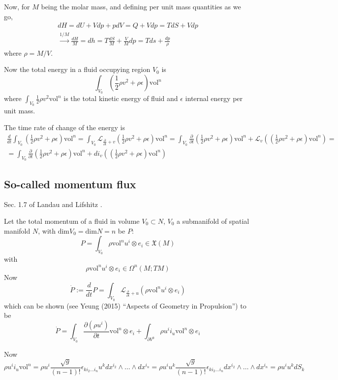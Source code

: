 \documentclass[twoside,landscape,10pt]{amsart}
\theoremstyle{plain}
\theoremstyle{definition}
\theoremstyle{remark}
\theoremstyle{remark}
\begin{document}
\begin{multicols*}{2}
Now, for $M$ being the molar mass, and defining per unit mass quantities as we go,
\[
\begin{gathered}
  dH = dU + Vdp + pdV = Q + Vdp = TdS + Vdp \\
  \xrightarrow{ 1/M} \frac{dH}{M} = dh = T \frac{dS}{M} + \frac{V}{M} dp = Tds + \frac{dp}{\rho}
\end{gathered}
\]
where $\rho = M/V$.  

Now the total energy in a fluid occupying region $V_0$ is 
\[
\int_{V_0} \left( \frac{1}{2} \rho v^2 + \rho \epsilon \right)\text{vol}^n
\]
where $\int_{V_0} \frac{1}{2} \rho v^2 \text{vol}^n$ is the total kinetic energy of fluid and $\epsilon$ internal energy per unit mass.  

The time rate of change of the energy is 
\[
\begin{gathered}
  \frac{d}{dt} \int_{V_0} ( \frac{1}{2} \rho v^2 + \rho \epsilon )\text{vol}^n = \int_{V_0} \mathcal{L}_{ \frac{\partial}{\partial t} + v } (\frac{1}{2} \rho v^2 + \rho \epsilon )\text{vol}^n = \int_{V_0} \frac{\partial }{\partial t} (\frac{1}{2} \rho v^2 + \rho \epsilon ) \text{vol}^n + \mathcal{L}_v ((\frac{1}{2} \rho v^2 + \rho \epsilon ) \text{vol}^n ) = \\
  = \int_{V_0} \frac{\partial }{\partial t} (\frac{1}{2} \rho v^2 + \rho \epsilon ) \text{vol}^n + di_v ((\frac{1}{2} \rho v^2 + \rho \epsilon ) \text{vol}^n ) 
\end{gathered}
\]

\subsection*{So-called momentum flux}

Sec. 1.7 of Landau and Lifshitz \cite{LLandauELifshitz1987}.  

Let the total momentum of a fluid in volume $V_0 \subset N$, $V_0$ a submanifold of spatial manifold $N$, with $\text{dim}V_0 = \text{dim}N =n$ be $P$:
\[
P = \int_{V_0} \rho \text{vol}^n u^i \otimes e_i \in \mathfrak{X}(M)
\]
with 
\[
\rho \text{vol}^n u^i \otimes e_i \in \Omega^n(M;TM)
\]
Now 
\[
\dot{P} := \frac{d}{dt}P = \int_{V_0} \mathcal{L}_{\frac{ \partial}{\partial t} + u} (\rho \text{vol}^nu^i \otimes e_i)
\]
which can be shown (see Yeung (2015) ``Aspects of Geometry in Propulsion'') to be
\[
\dot{P} = \int_{V_0} \frac{ \partial (\rho u^i)}{ \partial t} \text{vol}^n \otimes e_i + \int_{\partial V^0} \rho u^i i_u \text{vol}^n \otimes e_i
\]

Now
\[
\rho u^i i_u \text{vol}^n = \rho u^i \frac{\sqrt{g}}{(n-1)!} \epsilon_{ki_2\dots i_n} u^k dx^{i_2} \wedge \dots \wedge dx^{i_n} = \rho u^i u^k \frac{\sqrt{g}}{ (n-1)!} \epsilon_{ki_2 \dots i_n} dx^{i_2} \wedge \dots \wedge dx^{i_n} = \rho u^i u^k dS_k
\]


\end{multicols*}
\end{document}
